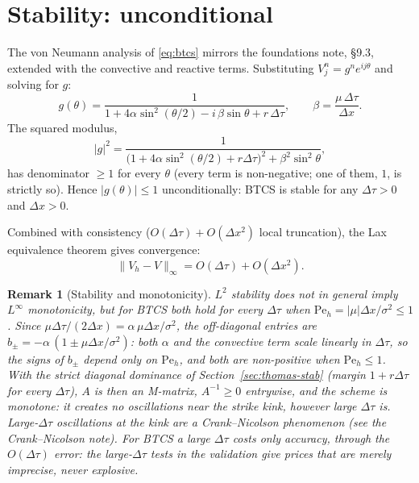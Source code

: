 \documentclass[11pt,a4paper]{article}
\newtheorem{remark}[proposition]{Remark}
\begin{document}
\section{Stability: unconditional}

The von Neumann analysis of \eqref{eq:btcs} mirrors the foundations note, §9.3,
extended with the convective and reactive terms. Substituting
$V_j^n = g^n e^{ij\theta}$ and solving for $g$:
\begin{equation}
g(\theta) = \frac{1}{1 + 4\alpha\sin^2(\theta/2) - i\,\beta\sin\theta + r\,\Delta\tau},
\qquad \beta = \frac{\mu\,\Delta\tau}{\Delta x}.
\label{eq:btcs-amplification}
\end{equation}
The squared modulus,
\[
|g|^2 = \frac{1}{\bigl(1 + 4\alpha\sin^2(\theta/2) + r\Delta\tau\bigr)^2 + \beta^2\sin^2\theta},
\]
has denominator $\ge 1$ for every $\theta$ (every term is
non-negative; one of them, $1$, is strictly so). Hence $|g(\theta)|
\le 1$ unconditionally: BTCS is stable for any $\Delta\tau > 0$ and
$\Delta x > 0$.

Combined with consistency ($O(\Delta\tau) + O(\Delta x^2)$ local
truncation), the Lax equivalence theorem gives convergence:
\[
\|V_h - V\|_\infty = O(\Delta\tau) + O(\Delta x^2).
\]

\begin{remark}[Stability and monotonicity]
$L^2$ stability does not in general imply $L^\infty$ monotonicity,
but for BTCS both hold for every $\Delta\tau$ when
$\mathrm{Pe}_h = |\mu|\Delta x/\sigma^2 \le 1$. Since
$\mu\Delta\tau/(2\Delta x) = \alpha\,\mu\Delta x/\sigma^2$, the
off-diagonal entries are
$b_\pm = -\alpha\,(1 \pm \mu\Delta x/\sigma^2)$: both $\alpha$ and the
convective term scale linearly in $\Delta\tau$, so the signs of
$b_\pm$ depend only on $\mathrm{Pe}_h$, and both are non-positive when
$\mathrm{Pe}_h \le 1$. With the strict diagonal dominance of
Section~\ref{sec:thomas-stab} (margin $1 + r\Delta\tau$ for every
$\Delta\tau$), $A$ is then an M-matrix, $A^{-1} \ge 0$ entrywise, and
the scheme is monotone: it creates no oscillations near the strike
kink, however large $\Delta\tau$ is. Large-$\Delta\tau$ oscillations
at the kink are a Crank--Nicolson phenomenon (see the Crank--Nicolson
note). For BTCS a large $\Delta\tau$ costs only accuracy, through the
$O(\Delta\tau)$ error: the large-$\Delta\tau$ tests in the validation
give prices that are merely imprecise, never explosive.
\end{remark}
\end{document}
